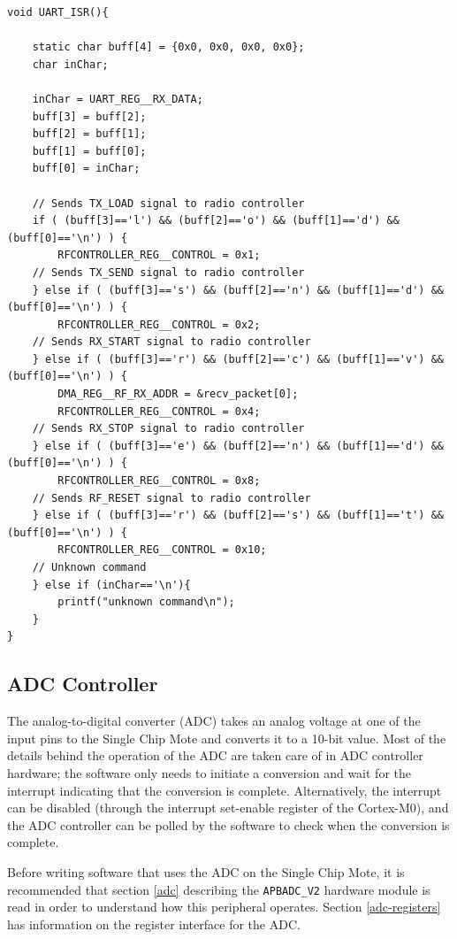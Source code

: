 \begin{lstlisting}
void UART_ISR(){	

    static char buff[4] = {0x0, 0x0, 0x0, 0x0};
    char inChar;

    inChar = UART_REG__RX_DATA;
    buff[3] = buff[2];
    buff[2] = buff[1];
    buff[1] = buff[0];
    buff[0] = inChar;
    
    // Sends TX_LOAD signal to radio controller
    if ( (buff[3]=='l') && (buff[2]=='o') && (buff[1]=='d') && (buff[0]=='\n') ) {
        RFCONTROLLER_REG__CONTROL = 0x1;
    // Sends TX_SEND signal to radio controller
    } else if ( (buff[3]=='s') && (buff[2]=='n') && (buff[1]=='d') && (buff[0]=='\n') ) {
        RFCONTROLLER_REG__CONTROL = 0x2;
    // Sends RX_START signal to radio controller
    } else if ( (buff[3]=='r') && (buff[2]=='c') && (buff[1]=='v') && (buff[0]=='\n') ) {
        DMA_REG__RF_RX_ADDR = &recv_packet[0];
        RFCONTROLLER_REG__CONTROL = 0x4;
    // Sends RX_STOP signal to radio controller
    } else if ( (buff[3]=='e') && (buff[2]=='n') && (buff[1]=='d') && (buff[0]=='\n') ) {
        RFCONTROLLER_REG__CONTROL = 0x8;
    // Sends RF_RESET signal to radio controller
    } else if ( (buff[3]=='r') && (buff[2]=='s') && (buff[1]=='t') && (buff[0]=='\n') ) {
        RFCONTROLLER_REG__CONTROL = 0x10;
    // Unknown command
    } else if (inChar=='\n'){	
        printf("unknown command\n");		
    }
}
\end{lstlisting}

\subsection{ADC Controller}
The analog-to-digital converter (ADC) takes an analog voltage at one of the input pins to the Single Chip Mote and converts it to a 10-bit value. Most of the details behind the operation of the ADC are taken care of in ADC controller hardware; the software only needs to initiate a conversion and wait for the interrupt indicating that the conversion is complete. Alternatively, the interrupt can be disabled (through the interrupt set-enable register of the Cortex-M0), and the ADC controller can be polled by the software to check when the conversion is complete.

Before writing software that uses the ADC on the Single Chip Mote, it is recommended that section \ref{adc} describing the \texttt{APBADC\_V2} hardware module is read in order to understand how this peripheral operates. Section \ref{adc-registers} has information on the register interface for the ADC.

